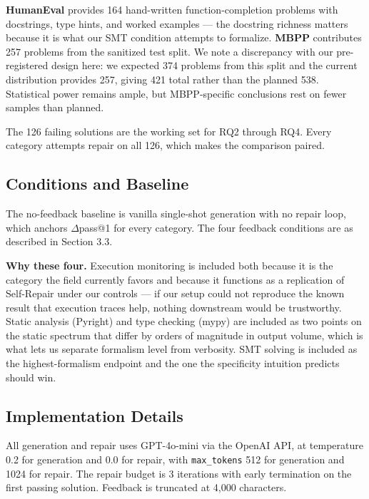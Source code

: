 \textbf{HumanEval} \cite{Chen2021Evaluating} provides 164 hand-written function-completion problems with docstrings, type hints, and worked examples --- the docstring richness matters because it is what our SMT condition attempts to formalize. \textbf{MBPP} \cite{Austin2021Program} contributes 257 problems from the sanitized test split. We note a discrepancy with our pre-registered design here: we expected 374 problems from this split and the current distribution provides 257, giving 421 total rather than the planned 538. Statistical power remains ample, but MBPP-specific conclusions rest on fewer samples than planned.

The 126 failing solutions are the working set for RQ2 through RQ4. Every category attempts repair on all 126, which makes the comparison paired.

\subsection{Conditions and Baseline}

The no-feedback baseline is vanilla single-shot generation with no repair loop, which anchors $\Delta$pass@1 for every category. The four feedback conditions are as described in Section 3.3.

\textbf{Why these four.} Execution monitoring is included both because it is the category the field currently favors and because it functions as a replication of Self-Repair \cite{Olausson2023SelfRepair} under our controls --- if our setup could not reproduce the known result that execution traces help, nothing downstream would be trustworthy. Static analysis (Pyright) and type checking (mypy) are included as two points on the static spectrum that differ by orders of magnitude in output volume, which is what lets us separate formalism level from verbosity. SMT solving is included as the highest-formalism endpoint and the one the specificity intuition predicts should win.

\subsection{Implementation Details}

All generation and repair uses GPT-4o-mini via the OpenAI API, at temperature 0.2 for generation and 0.0 for repair, with \texttt{max\_tokens} 512 for generation and 1024 for repair. The repair budget is 3 iterations with early termination on the first passing solution. Feedback is truncated at 4,000 characters.

